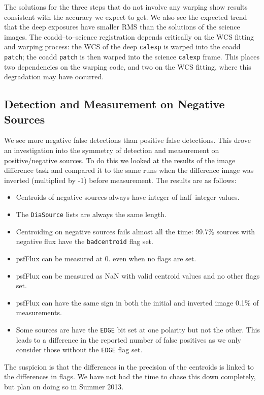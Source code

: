 \documentclass[prd, nofootinbib, floatfix, 11pt,tightenlines,times]{article}
\begin{document}
The solutions for the three steps that do not involve any warping show results consistent with 
the accuracy we expect to get.  We also see the expected trend that the deep exposures have 
smaller RMS than the solutions of the science images.  The coadd--to--science registration
depends critically on the WCS fitting and warping process: the WCS of the deep {\tt calexp} is warped
into the coadd {\tt patch}; the coadd {\tt patch} is then warped into the science {\tt calexp} frame.
This places two dependencies on the warping code, and two on the WCS fitting, where
this degradation may have occurred.

\subsection{Detection and Measurement on Negative Sources}
We see more negative false detections than positive false detections.  This drove an investigation 
into the symmetry of detection and measurement on positive/negative sources.  To do this we looked at the 
results of the image difference task and compared it to the same runs when the difference image was inverted
(multiplied by -1) before measurement.  The results are as follows:
\begin{itemize}
\item Centroids of negative sources always have integer of half--integer values.
\item The {\tt DiaSource} lists are always the same length.
\item Centroiding on negative sources fails almost all the time: 99.7\% sources with negative flux
have the {\tt badcentroid} flag set.
\item psfFlux can be measured at 0. even when no flags are set.
\item psfFlux can be measured as NaN with valid centroid values and no other flags set.
\item psfFlux can have the same sign in both the initial and inverted image 0.1\% of measurements.
\item Some sources are have the {\tt EDGE} bit set at one polarity but not the other.  
  This leads to a difference in the reported number of false positives as we only consider 
  those without the {\tt EDGE} flag set.
\end{itemize}

The suspicion is that the differences in the precision of the centroids is linked to the differences in flags.
We have not had the time to chase this down completely, but plan on doing so in Summer 2013.
\end{document}
